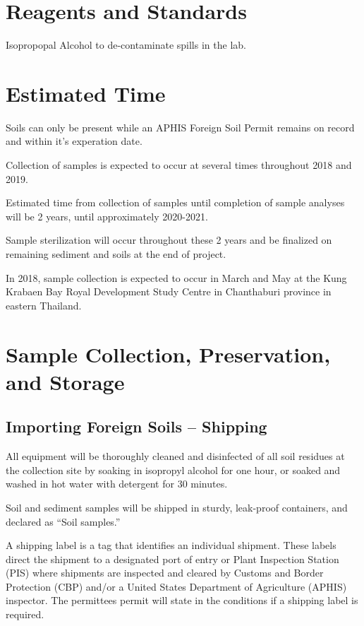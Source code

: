 \documentclass[12pt]{../SOP3}\usepackage[]{graphicx}\usepackage[]{color}
\begin{document}
\section{Reagents and Standards}

\NP Isopropopal Alcohol to de-contaminate spills in the lab.

\section{Estimated Time}

\NP Soils can only be present while an APHIS Foreign Soil Permit remains on record and within it's experation date.

\NP Collection of samples is expected to occur at several times throughout 2018 and 2019. 

\NP Estimated time from collection of samples until completion of sample analyses will be 2 years, until approximately 2020-2021. 

\NP Sample sterilization will occur throughout these 2 years and be finalized on remaining sediment and soils at the end of project. 

\NP In 2018, sample collection is expected to occur in March and May at the Kung Krabaen Bay Royal Development Study Centre in Chanthaburi province in eastern Thailand.

\section{Sample Collection, Preservation, and Storage}

\subsection{Importing Foreign Soils -- Shipping}

\NP All equipment will be thoroughly cleaned and disinfected of all soil residues at the collection site by soaking in isopropyl alcohol for one hour, or soaked and washed in hot water with detergent for 30 minutes. 

\NP Soil and sediment samples will be shipped in sturdy, leak-proof containers, and declared as ``Soil samples.'' 

\NP A shipping label is a tag that identifies an individual shipment. These labels direct the shipment to a designated port of entry or Plant Inspection Station (PIS) where shipments are inspected and cleared by Customs and Border Protection (CBP) and/or a United States Department of Agriculture (APHIS) inspector. The permittees permit will state in the conditions if a shipping label is required.
\end{document}
